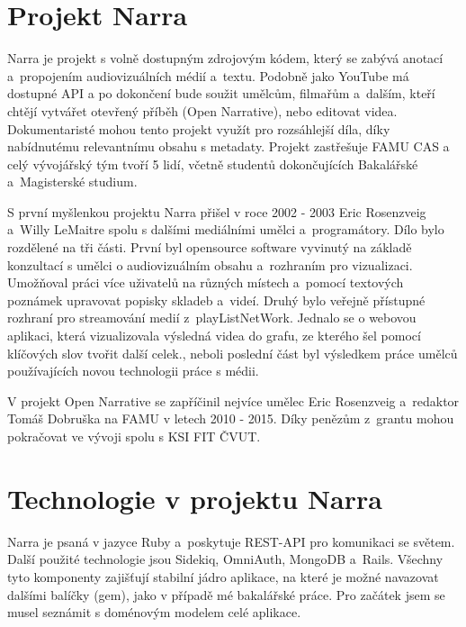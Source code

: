 \section{Projekt Narra}
\par Narra je projekt s volně dostupným zdrojovým kódem, který se zabývá anotací a~propojením audiovizuálních médií a~textu. Podobně jako YouTube má dostupné API a po dokončení bude soužit umělcům, filmařům a~dalším, kteří chtějí vytvářet otevřený příběh (Open Narrative), nebo editovat videa. Dokumentaristé mohou tento projekt využít pro rozsáhlejší díla, díky nabídnutému relevantnímu obsahu s metadaty. Projekt zastřešuje FAMU CAS a celý vývojářský tým tvoří 5 lidí, včetně studentů dokončujících Bakalářské a~Magisterské studium.
\par S první myšlenkou projektu Narra přišel v roce 2002 - 2003 Eric Rosenzveig a~Willy LeMaitre spolu s dalšími mediálními umělci a~programátory. Dílo bylo rozdělené na tři části. První byl opensource software vyvinutý na základě konzultací s umělci o audiovizuálním obsahu a~rozhraním pro vizualizaci. Umožňoval práci více uživatelů na různých místech a~pomocí textových poznámek upravovat popisky skladeb a~videí. Druhý bylo veřejně přístupné rozhraní pro streamování medií z~playListNetWork. Jednalo se o webovou aplikaci, která vizualizovala výsledná videa do grafu, ze kterého šel pomocí klíčových slov tvořit další celek., neboli poslední část byl výsledkem práce umělců používajících novou technologii práce s médii.
\par V projekt Open Narrative se zapříčinil nejvíce umělec Eric Rosenzveig a~redaktor Tomáš Dobruška na FAMU v letech 2010 - 2015. Díky penězům z~grantu mohou pokračovat ve vývoji spolu s KSI FIT ČVUT.

\section{Technologie v projektu Narra} 
\par Narra je psaná v jazyce Ruby a~poskytuje REST-API pro komunikaci se světem. Další použité technologie jsou Sidekiq, OmniAuth, MongoDB a~Rails. Všechny tyto komponenty zajišťují stabilní jádro aplikace, na které je možné navazovat dalšími balíčky (gem), jako v případě mé bakalářské práce. Pro začátek jsem se musel seznámit s doménovým modelem celé aplikace.


